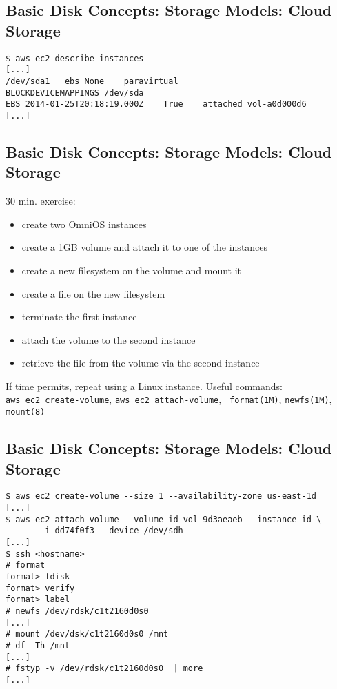 \documentclass[xga]{xdvislides}
\begin{document}
\subsection{Basic Disk Concepts: Storage Models: Cloud Storage}
\begin{verbatim}
$ aws ec2 describe-instances
[...]
/dev/sda1	ebs	None	paravirtual
BLOCKDEVICEMAPPINGS	/dev/sda
EBS	2014-01-25T20:18:19.000Z	True	attached vol-a0d000d6
[...]
\end{verbatim}


\subsection{Basic Disk Concepts: Storage Models: Cloud Storage}

30 min. exercise: \\

\begin{itemize}
	\item create two OmniOS instances
	\item create a 1GB volume and attach it to one of the instances
	\item create a new filesystem on the volume and mount it
	\item create a file on the new filesystem
	\item terminate the first instance
	\item attach the volume to the second instance
	\item retrieve the file from the volume via the second instance
\end{itemize}

If time permits, repeat using a Linux instance.
\vspace{.25in}
Useful commands: \\
{\tt aws ec2 create-volume}, {\tt aws ec2 attach-volume}, {\tt
format(1M)}, {\tt newfs(1M)}, {\tt mount(8)}

\subsection{Basic Disk Concepts: Storage Models: Cloud Storage}
\begin{verbatim}
$ aws ec2 create-volume --size 1 --availability-zone us-east-1d
[...]
$ aws ec2 attach-volume --volume-id vol-9d3aeaeb --instance-id \
        i-dd74f0f3 --device /dev/sdh
[...]
$ ssh <hostname>
# format
format> fdisk
format> verify
format> label
# newfs /dev/rdsk/c1t2160d0s0
[...]
# mount /dev/dsk/c1t2160d0s0 /mnt
# df -Th /mnt
[...]
# fstyp -v /dev/rdsk/c1t2160d0s0  | more
[...]
\end{verbatim}
\end{document}
